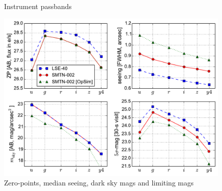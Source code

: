\documentclass[\docopts]{\docclass}
\begin{document}
\begin{figure}[t]
\begin{center}
\caption{Instrument passbands}
\end{center}
\end{figure}


\begin{figure}[t]
\begin{center}
\includegraphics[width=\linewidth]{lsst_model_summary.pdf}
\caption{Zero-points, median seeing, dark sky mags and limiting mags}
\label{fig:lsst_model_summary}
\end{center}
\end{figure}
\end{document}
